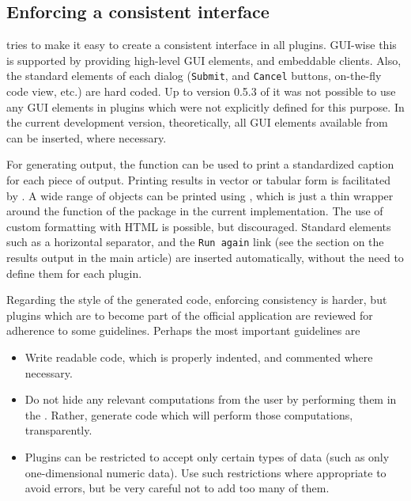 \documentclass[article,shortnames]{jss}
\begin{document}
\subsection{Enforcing a consistent interface}
\label{sec:technical_plugins_consistency}
 tries to make it easy to create a consistent interface in all plugins.
GUI-wise this is supported by providing high-level GUI elements, and embeddable
clients. Also, the standard elements of each dialog (\texttt{Submit}, and
\texttt{Cancel} buttons, on-the-fly code view, etc.) are hard coded. Up to version
0.5.3 of  it was not possible to use any GUI elements in plugins which
were not explicitly defined for this purpose. In the current development
version, theoretically, all GUI elements available from  can be inserted,
where necessary.

For generating output, the function  can be used to print a
standardized caption for each piece of output. Printing results in vector or
tabular form is facilitated by . A wide range of objects can be
printed using , which is just a thin wrapper around the
 function of the  package \citep{Lecoutre2003} in the current
implementation. The use of custom formatting with HTML is possible, but
discouraged. Standard elements such as a horizontal separator, and the \texttt{Run again}
link (see the section on the results output in the main article) are inserted automatically, without the need to define
them for each plugin.

Regarding the style of the generated  code, enforcing consistency is harder,
but plugins which are to become part of the official  application are
reviewed for adherence to some guidelines. Perhaps the most important guidelines
are 

\begin{itemize}
  \item 
  Write readable code, which is properly indented, and commented where necessary.

  \item 
  Do not hide any relevant computations from the user by performing them in the
  . Rather, generate  code which will perform
  those computations, transparently.

  \item
  Plugins can be restricted to accept only certain types of data (such as only one-dimensional numeric data).
  Use such restrictions where appropriate to avoid errors, but be very careful not to add
  too many of them.
\end{itemize}
\end{document}
